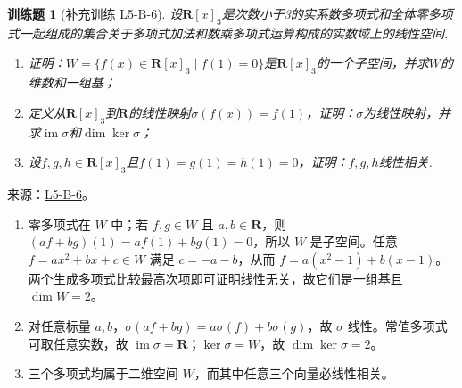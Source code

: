 \documentclass[12pt,fontset=fandol]{ctexart}
\newtheorem{exercise}{训练题}[section]
\begin{document}
\begin{exercise}[补充训练 L5-B-6]\label{prob:L5-B-6}
设$\mathbf{R}[x]_3$是次数小于3的实系数多项式和全体零多项式一起组成的集合关于多项式加法和数乘多项式运算构成的实数域上的线性空间.
        \begin{enumerate}
            \item 证明：$W=\{f(x)\in \mathbf{R}[x]_3 \mid f(1)=0\}$是$\mathbf{R}[x]_3$的一个子空间，并求$W$的维数和一组基；

            \item 定义从$\mathbf{R}[x]_3$到$\mathbf{R}$的线性映射$\sigma(f(x))=f(1)$，证明：$\sigma$为线性映射，并求$\operatorname{im}\sigma$和$\dim\ker\sigma$；

            \item 设$f,g,h \in \mathbf{R}[x]_3$且$f(1)=g(1)=h(1)=0$，证明：$f,g,h$线性相关.
        \end{enumerate}
\end{exercise}
\noindent 来源：\href{https://github.com/yhwu-is/Linear-Algebra-Left-Undone/blob/new/%E8%AE%B2%E4%B9%89/%E4%B8%93%E9%A2%98/5%20%E7%BA%BF%E6%80%A7%E6%98%A0%E5%B0%84.tex}{L5-B-6}。
\begin{solve}
\begin{enumerate}
\item 零多项式在 $W$ 中；若 $f,g\in W$ 且 $a,b\in\mathbf R$，则 $(af+bg)(1)=af(1)+bg(1)=0$，所以 $W$ 是子空间。任意 $f=ax^2+bx+c\in W$ 满足 $c=-a-b$，从而 $f=a(x^2-1)+b(x-1)$。两个生成多项式比较最高次项即可证明线性无关，故它们是一组基且 $\dim W=2$。
\item 对任意标量 $a,b$，$\sigma(af+bg)=a\sigma(f)+b\sigma(g)$，故 $\sigma$ 线性。常值多项式可取任意实数，故 $\operatorname{im}\sigma=\mathbf R$；$\ker\sigma=W$，故 $\dim\ker\sigma=2$。
\item 三个多项式均属于二维空间 $W$，而其中任意三个向量必线性相关。\end{enumerate}
\end{solve}
\end{document}
